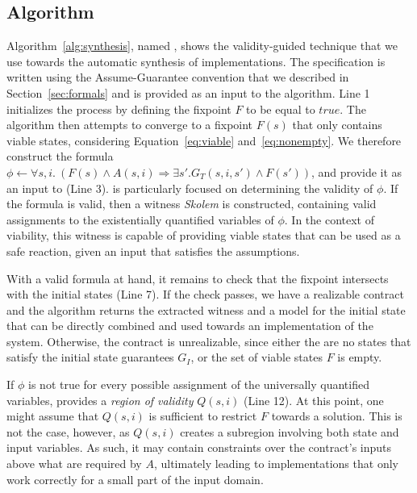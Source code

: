 \subsection{Algorithm}
\label{sec:alg}
Algorithm~\ref{alg:synthesis}, named \jsynvg, shows the validity-guided technique that we use towards the automatic synthesis of implementations. The specification is written using the Assume-Guarantee convention that we described in Section~\ref{sec:formals} and is provided as an input to the algorithm.
Line 1 initializes the process by defining the fixpoint $F$ to be equal to
$true$. The algorithm then attempts to converge to a fixpoint $F(s)$
that only contains viable states, considering Equation~\ref{eq:viable}
and~\ref{eq:nonempty}.
We therefore construct the formula $\phi \gets \forall s,i. \ (F(s) \land A(s,i)
\Rightarrow \exists s'. G_{T}(s,i,s') \land F(s'))$, and provide it as an input to \aeval (Line 3). \aeval is particularly
focused on determining the validity of $\phi$. If the formula is valid, then a witness
\textit{Skolem} is constructed, containing valid assignments to the
existentially quantified variables of $\phi$. In the context of viability, this
witness is capable of providing viable states that can be used as a safe
reaction, given an input that
satisfies the assumptions. 

With a valid formula at hand, it remains to check that the fixpoint intersects with the initial states (Line 7).  If the check passes, we have a realizable contract and the algorithm returns the extracted witness and a model for the initial state that can be directly combined and used towards an implementation of the system. Otherwise, the contract is unrealizable, since either the are no states that satisfy the
initial state guarantees $G_I$, or the set of viable states $F$ is empty.


If $\phi$ is not true for every possible assignment of the universally
quantified variables, \aeval provides a \textit{region of validity} $Q(s,i)$
(Line 12).
At this point, one might assume that $Q(s,i)$ is sufficient to restrict $F$ towards a solution. This is not the case, however, as $Q(s,i)$ creates a subregion
involving both state and input variables. As such, it may contain constraints
over the contract's inputs above what are required by $A$, ultimately leading to implementations that only work correctly for a small part of the input domain.


